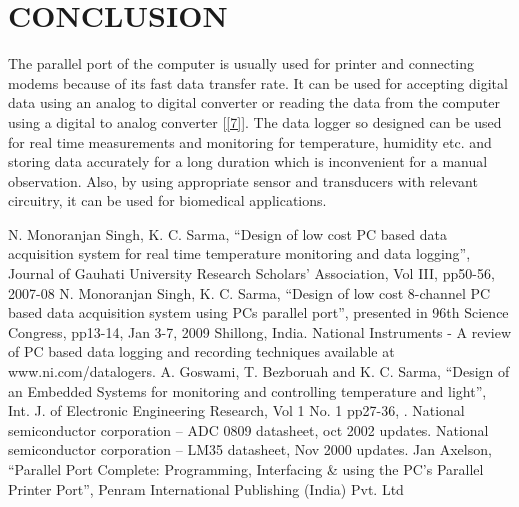 \documentclass[10pt,a4paper]{article}
\begin{document}
\section{CONCLUSION}
The parallel port of the computer is usually used for printer and connecting modems because of its fast data transfer rate. It can be used for accepting digital data using an analog to digital converter or reading the data from the computer using a digital to analog converter [\ref{7}]. The data logger so designed can be used for real time measurements and monitoring for temperature, humidity etc. and storing data accurately for a long duration which is inconvenient for a manual observation. Also, by using appropriate sensor and transducers with relevant circuitry, it can be used for biomedical applications.

\begin{thebibliography}{1}

\bibitem{}\label{1}  N. Monoranjan Singh, K. C. Sarma, ``Design of low cost PC based data acquisition system for real time temperature monitoring and data logging'', Journal of Gauhati University Research Scholars’ Association, Vol III, pp50-56, 2007-08
\bibitem{}\label{2} N. Monoranjan Singh, K. C. Sarma, ``Design of low cost 8-channel PC based data acquisition system using PCs parallel port'', presented in 96th Science Congress, pp13-14, Jan 3-7, 2009 Shillong, India.
\bibitem{}\label{3} National Instruments - A review of PC based data logging and recording techniques available at www.ni.com/datalogers.
\bibitem{}\label{4} A. Goswami, T. Bezboruah and K. C. Sarma, ``Design of an Embedded Systems for monitoring and controlling temperature and light'', Int. J. of Electronic Engineering Research, Vol 1 No. 1  pp27-36, .
\bibitem{}\label{5} National semiconductor corporation – ADC 0809 datasheet, oct 2002 updates.
\bibitem{}\label{6} National semiconductor corporation – LM35 datasheet, Nov 2000 updates.
\bibitem{}\label{7} Jan Axelson, ``Parallel Port Complete: Programming, Interfacing \& using the PC’s Parallel Printer Port'', Penram International Publishing (India) Pvt. Ltd

\end{thebibliography}
\end{document}
